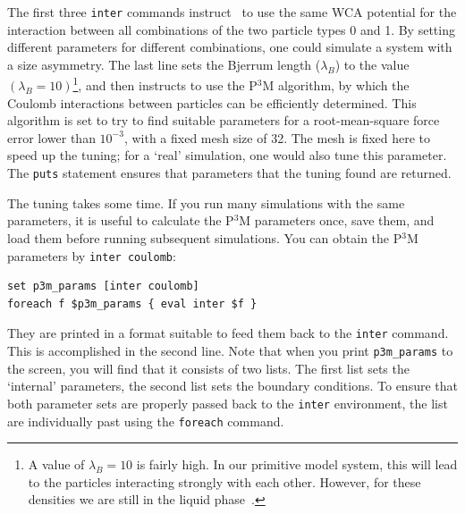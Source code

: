 \documentclass[
a4paper,                        %
11pt,                           %
twoside,                        %
footsepline,                    %
headsepline,                    %
headexclude,                    %
footexclude,                    %
pagesize,                       %
]{scrartcl}
\newtheorem{task}{Task}
\begin{document}
\noindent The first three \verb|inter| commands instruct \es\ to use the same WCA potential for the interaction between all combinations of the two particle types 0 and 1. By setting different parameters for different combinations, one could simulate a system with a size asymmetry. The last line sets the Bjerrum length ($\lambda_{B}$) to the value $(\lambda_{B} = 10)$\footnote{A value of $\lambda_{B} = 10$ is fairly high. In our primitive model system, this will lead to the particles interacting strongly with each other. However, for these densities we are still in the liquid phase~\cite{smit}.}, and then instructs \es{} to use the P$^3$M algorithm, by which the Coulomb interactions between particles can be efficiently determined. This algorithm is set to try to find suitable parameters for a root-mean-square force error lower than $10^{-3}$, with a fixed mesh size of 32. The mesh is fixed here to speed up the tuning; for a `real' simulation, one would also tune this parameter. The \verb|puts| statement ensures that parameters that the tuning found are returned. 

The tuning takes some time. If you run many simulations with the same parameters, it is useful to calculate the P$^3$M parameters once, save them, and load them before running subsequent simulations. You can obtain the P$^3$M parameters by \verb|inter coulomb|:

{\vspace{0,2cm}\small
\begin{lstlisting}[numbers=none]
set p3m_params [inter coulomb]
foreach f $p3m_params { eval inter $f }
\end{lstlisting}\vspace{0,2cm}
}

\noindent They are printed in a format suitable to feed them back to the \verb|inter| command. This is accomplished in the second line. Note that when you print \verb|p3m_params| to the screen, you will find that it consists of two lists. The first list sets the `internal' parameters, the second list sets the boundary conditions. To ensure that both parameter sets are properly passed back to the \verb|inter| environment, the list are individually past using the \verb|foreach| command.

\vspace{1cm}
\vspace{1cm}
\end{document}
